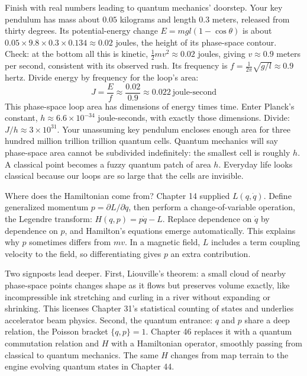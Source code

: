 \begin{mainline}
Finish with real numbers leading to quantum mechanics' doorstep. Your key pendulum has mass about \(0.05\) kilograms and length \(0.3\) meters, released from thirty degrees. Its potential-energy change \(E = mgl(1-\cos\theta)\) is about \(0.05\times9.8\times0.3\times0.134\approx0.02\) joules, the height of its phase-space contour. Check: at the bottom all this is kinetic, \(\frac{1}{2}mv^{2}\approx0.02\) joules, giving \(v\approx0.9\) meters per second, consistent with its observed rush. Its frequency is \(f=\frac{1}{2\pi}\sqrt{g/l}\approx0.9\) hertz. Divide energy by frequency for the loop's area:
\[
  J = \frac{E}{f} \approx \frac{0.02}{0.9} \approx 0.022 \ \text{joule-second}
\]
This phase-space loop area has dimensions of energy times time. Enter Planck's constant, \(h\approx6.6\times10^{-34}\) joule-seconds, with exactly those dimensions. Divide: \(J/h\approx3\times10^{31}\). Your unassuming key pendulum encloses enough area for three hundred million trillion trillion quantum cells. Quantum mechanics will say phase-space area cannot be subdivided indefinitely: the smallest cell is roughly \(h\). A classical point becomes a fuzzy quantum patch of area \(h\). Everyday life looks classical because our loops are so large that the cells are invisible.
\end{mainline}

\begin{challenge}
Where does the Hamiltonian come from? Chapter 14 supplied \(L(q,\dot{q})\). Define generalized momentum \(p=\partial L/\partial\dot{q}\), then perform a change-of-variable operation, the Legendre transform: \(H(q,p)=p\dot{q}-L\). Replace dependence on \(\dot{q}\) by dependence on \(p\), and Hamilton's equations emerge automatically. This explains why \(p\) sometimes differs from \(mv\). In a magnetic field, \(L\) includes a term coupling velocity to the field, so differentiating gives \(p\) an extra contribution.

Two signposts lead deeper. First, Liouville's theorem: a small cloud of nearby phase-space points changes shape as it flows but preserves volume exactly, like incompressible ink stretching and curling in a river without expanding or shrinking. This licenses Chapter 31's statistical counting of states and underlies accelerator beam physics. Second, the quantum entrance: \(q\) and \(p\) share a deep relation, the Poisson bracket \(\{q,p\}=1\). Chapter 46 replaces it with a quantum commutation relation and \(H\) with a Hamiltonian operator, smoothly passing from classical to quantum mechanics. The same \(H\) changes from map terrain to the engine evolving quantum states in Chapter 44.
\end{challenge}

